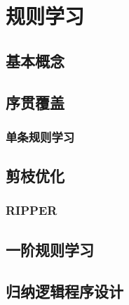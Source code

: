 \newpage
\section{规则学习}
\subsection{基本概念}
\subsection{序贯覆盖}
\subsubsection{单条规则学习}
\subsection{剪枝优化}
\subsubsection{RIPPER}
\subsection{一阶规则学习}
\subsection{归纳逻辑程序设计}